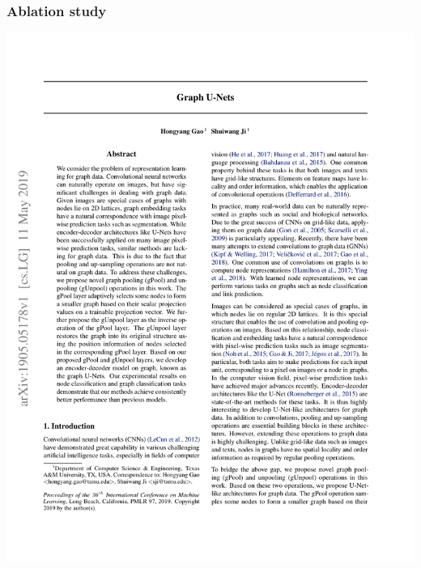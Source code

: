 \documentclass[12pt,aspectratio=169]{beamer}
\begin{document}
    \begin{frame}
        \frametitle{Ablation study}

        \centering
        \includegraphics[page=8,trim=1cm 20cm 1cm 2.5cm,clip,scale=0.7]{Graph U-Net.pdf}
    \end{frame}
\end{document}
